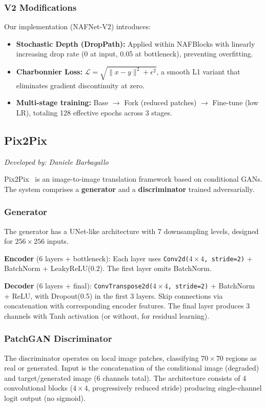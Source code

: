 \subsubsection{V2 Modifications}
Our implementation (NAFNet-V2) introduces:
\begin{itemize}
    \item \textbf{Stochastic Depth (DropPath):} Applied within NAFBlocks with linearly increasing drop rate (0 at input, 0.05 at bottleneck), preventing overfitting.
    \item \textbf{Charbonnier Loss:} $\mathcal{L} = \sqrt{\|x - y\|^2 + \epsilon^2}$, a smooth L1 variant that eliminates gradient discontinuity at zero.
    \item \textbf{Multi-stage training:} Base $\to$ Fork (reduced patches) $\to$ Fine-tune (low LR), totaling 128 effective epochs across 3 stages.
\end{itemize}

\subsection{Pix2Pix}
\label{subsec:pix2pix}

\textit{Developed by: Daniele Barbagallo}

\medskip

Pix2Pix~\cite{pix2pix} is an image-to-image translation framework based on conditional GANs. The system comprises a \textbf{generator} and a \textbf{discriminator} trained adversarially.

\subsubsection{Generator}
The generator has a UNet-like architecture with 7 downsampling levels, designed for $256\!\times\!256$ inputs.

\textbf{Encoder} (6 layers + bottleneck): Each layer uses \texttt{Conv2d($4\!\times\!4$, stride=2)} + BatchNorm + LeakyReLU(0.2). The first layer omits BatchNorm.

\textbf{Decoder} (6 layers + final): \texttt{Conv\-Transpose2d(\allowbreak{}$4\!\times\!4$, stride=2)} + BatchNorm + ReLU, with Dropout(0.5) in the first 3 layers. Skip connections via concatenation with corresponding encoder features. The final layer produces 3 channels with Tanh activation (or without, for residual learning).

\subsubsection{PatchGAN Discriminator}
The discriminator operates on local image patches, classifying $70\!\times\!70$ regions as real or generated. Input is the concatenation of the conditional image (degraded) and target/generated image (6 channels total). The architecture consists of 4 convolutional blocks ($4\!\times\!4$, progressively reduced stride) producing single-channel logit output (no sigmoid).

